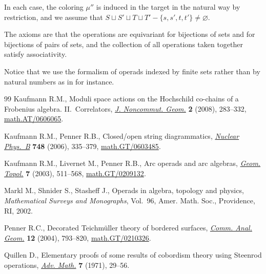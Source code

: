 \documentclass[11pt]{article}
\begin{document}
\noindent In each case, the coloring $\mu ''$ is  induced in the
target in the natural way by restriction, and we assume that $S\sqcup S'\sqcup T\sqcup T'-\{
s,s',t,t'\}\neq\varnothing$.

The  axioms are that the operations are equivariant
for bijections of sets and for bijections of pairs of sets, and the collection of all operations taken together
satisfy associativity.


Notice that we use the formalism of operads indexed by f\/inite
sets rather than by natural numbers as in \cite{MSS} for instance.


\begin{thebibliography}{99}
Kaufmann R.M.,
Moduli space actions on the Hochschild co-chains of a Frobenius algebra. II.~Correlators,
\href{http://dx.doi.org/10.4171/JNCG/22}{{\it J. Noncommut. Geom.}} {\bf 2} (2008), 283--332,
\href{http://arxiv.org/abs/math.AT/0606065}{math.AT/0606065}.


Kaufmann R.M., Penner R.B.,
Closed/open string diagrammatics,
\href{http://dx.doi.org/10.1016/j.nuclphysb.2006.03.036}{{\it Nuclear Phys.~B}} {\bf 748} (2006), 335--379,
\href{http://arxiv.org/abs/math.GT/0603485}{math.GT/0603485}.

Kaufmann R.M., Livernet  M., Penner R.B.,
Arc operads and arc algebras,
\href{http://dx.doi.org/10.2140/gt.2003.7.511}{{\it Geom. Topol.}} {\bf 7} (2003), 511--568,
\href{http://arxiv.org/abs/math.GT/0209132}{math.GT/0209132}.

 Markl M., Shnider S., Stashef\/f J.,
Operads in algebra, topology and physics,
{\it Mathematical Surveys and Monographs}, Vol.~96, Amer. Math. Soc., Providence, RI, 2002.




Penner R.C.,
Decorated Teichm\"uller theory of bordered surfaces,
\href{http://projecteuclid.org/getRecord?id=euclid.cag/1098468019}{{\it Comm. Anal. Geom.}} {\bf  12}  (2004),  793--820,
\href{http://arxiv.org/abs/math.GT/0210326}{math.GT/0210326}.

Quillen D.,
Elementary proofs of some results of cobordism theory using Steenrod operations,
\href{http://dx.doi.org/10.1016/0001-8708(71)90041-7}{{\it Adv. Math.}} {\bf 7} (1971), 29--56.

\end{thebibliography}
\end{document}
